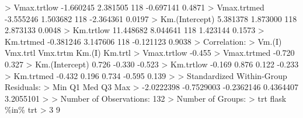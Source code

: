 \documentclass[
  letterpaper,
]{book}
\newenvironment{Shaded}{\begin{snugshade}}{\end{snugshade}}
\newcommand{\DecValTok}[1]{\textcolor[rgb]{0.68,0.00,0.00}{#1}}
\newcommand{\ErrorTok}[1]{\textcolor[rgb]{0.68,0.00,0.00}{#1}}
\newcommand{\FloatTok}[1]{\textcolor[rgb]{0.68,0.00,0.00}{#1}}
\newcommand{\FunctionTok}[1]{\textcolor[rgb]{0.28,0.35,0.67}{#1}}
\newcommand{\NormalTok}[1]{\textcolor[rgb]{0.00,0.23,0.31}{#1}}
\newcommand{\SpecialCharTok}[1]{\textcolor[rgb]{0.37,0.37,0.37}{#1}}
\begin{document}
\begin{Shaded}
\begin{Highlighting}[]
\SpecialCharTok{\textgreater{}}\NormalTok{ Vmax.trtlow      }\SpecialCharTok{{-}}\FloatTok{1.660245}  \FloatTok{2.381505} \DecValTok{118} \SpecialCharTok{{-}}\FloatTok{0.697141}  \FloatTok{0.4871}
\SpecialCharTok{\textgreater{}}\NormalTok{ Vmax.trtmed      }\SpecialCharTok{{-}}\FloatTok{3.555246}  \FloatTok{1.503682} \DecValTok{118} \SpecialCharTok{{-}}\FloatTok{2.364361}  \FloatTok{0.0197}
\SpecialCharTok{\textgreater{}} \FunctionTok{Km.}\NormalTok{(Intercept)    }\FloatTok{5.381378}  \FloatTok{1.873000} \DecValTok{118}  \FloatTok{2.873133}  \FloatTok{0.0048}
\SpecialCharTok{\textgreater{}}\NormalTok{ Km.trtlow        }\FloatTok{11.448682}  \FloatTok{8.044641} \DecValTok{118}  \FloatTok{1.423144}  \FloatTok{0.1573}
\SpecialCharTok{\textgreater{}}\NormalTok{ Km.trtmed        }\SpecialCharTok{{-}}\FloatTok{0.381246}  \FloatTok{3.147606} \DecValTok{118} \SpecialCharTok{{-}}\FloatTok{0.121123}  \FloatTok{0.9038}
\SpecialCharTok{\textgreater{}}\NormalTok{  Correlation}\SpecialCharTok{:} 
\ErrorTok{\textgreater{}}                \FunctionTok{Vm.}\NormalTok{(I) Vmx.trtl Vmx.trtm }\FunctionTok{Km.}\NormalTok{(I) Km.trtl}
\SpecialCharTok{\textgreater{}}\NormalTok{ Vmax.trtlow    }\SpecialCharTok{{-}}\FloatTok{0.455}                                 
\SpecialCharTok{\textgreater{}}\NormalTok{ Vmax.trtmed    }\SpecialCharTok{{-}}\FloatTok{0.720}  \FloatTok{0.327}                          
\SpecialCharTok{\textgreater{}} \FunctionTok{Km.}\NormalTok{(Intercept)  }\FloatTok{0.726} \SpecialCharTok{{-}}\FloatTok{0.330}   \SpecialCharTok{{-}}\FloatTok{0.523}                 
\SpecialCharTok{\textgreater{}}\NormalTok{ Km.trtlow      }\SpecialCharTok{{-}}\FloatTok{0.169}  \FloatTok{0.876}    \FloatTok{0.122}   \SpecialCharTok{{-}}\FloatTok{0.233}        
\SpecialCharTok{\textgreater{}}\NormalTok{ Km.trtmed      }\SpecialCharTok{{-}}\FloatTok{0.432}  \FloatTok{0.196}    \FloatTok{0.734}   \SpecialCharTok{{-}}\FloatTok{0.595}  \FloatTok{0.139} 
\SpecialCharTok{\textgreater{}} 
\ErrorTok{\textgreater{}}\NormalTok{ Standardized Within}\SpecialCharTok{{-}}\NormalTok{Group Residuals}\SpecialCharTok{:}
\ErrorTok{\textgreater{}}\NormalTok{        Min         Q1        Med         Q3        Max }
\SpecialCharTok{\textgreater{}} \SpecialCharTok{{-}}\FloatTok{2.0222398} \SpecialCharTok{{-}}\FloatTok{0.7529003} \SpecialCharTok{{-}}\FloatTok{0.2362146}  \FloatTok{0.4364407}  \FloatTok{3.2055101} 
\SpecialCharTok{\textgreater{}} 
\ErrorTok{\textgreater{}}\NormalTok{ Number of Observations}\SpecialCharTok{:} \DecValTok{132}
\SpecialCharTok{\textgreater{}}\NormalTok{ Number of Groups}\SpecialCharTok{:} 
\ErrorTok{\textgreater{}}\NormalTok{            trt flask }\SpecialCharTok{\%in\%}\NormalTok{ trt }
\SpecialCharTok{\textgreater{}}              \DecValTok{3}              \DecValTok{9}
\end{Highlighting}
\end{Shaded}
\end{document}
